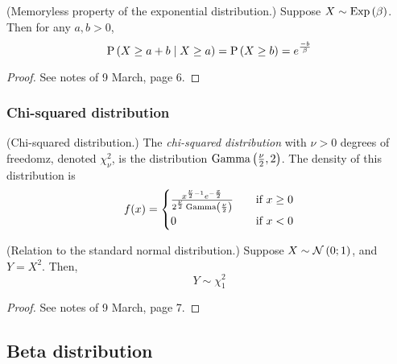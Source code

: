 \documentclass[11pt]{article}
\begin{document}
\begin{thm}{(Memoryless property of the exponential distribution.)}
    Suppose $X \sim \operatorname{Exp}\left(\beta\right)$.
    Then for any $a, b > 0$,
    \begin{equation}
        \label{eq:exponential-memoryless}
        \operatorname{P}{\left(X \geq a + b \;\vert\; X \geq a\right)}
        =
        \operatorname{P}{\left(X \geq b\right)}
        =
        e^\frac{-b}{\beta}
    \end{equation}
\end{thm}

\begin{proof}
    See notes of 9 March, page 6.
\end{proof}

\subsubsection{Chi-squared distribution}

\begin{defn}{(Chi-squared distribution.)}
    The \emph{chi-squared distribution} with $\nu > 0$ degrees of freedomz,
    denoted $\chi^2_\nu$, is the distribution $\operatorname{Gamma}\left(\frac{\nu}{2}, 2\right)$.
    The density of this distribution is
    \begin{equation*}
        f(x) = \begin{cases}
            \frac{
                x^{\frac{\nu}{2} - 1} e^{-\frac{x}{2}}
            }{
                2^{\frac{\nu}{2}} \operatorname{Gamma}\left(\frac{\nu}{2}\right)
            }
                &\quad\text{if } x \geq 0 \\
            0   &\quad\text{if } x < 0
        \end{cases}
    \end{equation*}
\end{defn}

\begin{thm}{(Relation to the standard normal distribution.)}
    Suppose $X \sim \operatorname{\mathcal{N}}\left(0;1\right)$, and $Y = X^2$.
    Then,
    \begin{equation}
        \label{eq:square-normal-chi-squared}
        Y \sim \chi^2_1
    \end{equation}
\end{thm}

\begin{proof}
    See notes of 9 March, page 7.
\end{proof}

\subsection{Beta distribution}
\end{document}
